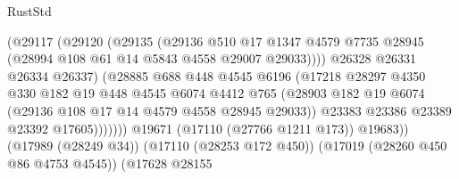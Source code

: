 \begin{lexlean}{RustStd}
\begin{coremodule}
                                          (@29117
                                            (@29120
                                              (@29135
                                                (@29136
                                                  @510
                                                  @17
                                                  @1347
                                                  @4579
                                                  @7735
                                                  @28945
                                                  (@28994 @108 @61 @14 @5843 @4558 @29007 @29033))))
                                            @26328
                                            @26331
                                            @26334
                                            @26337)
                                          (@28885
                                            @688
                                            @448
                                            @4545
                                            @6196
                                            (@17218
                                              @28297
                                              @4350
                                              @330
                                              @182
                                              @19
                                              @448
                                              @4545
                                              @6074
                                              @4412
                                              @765
                                              (@28903
                                                @182
                                                @19
                                                @6074
                                                (@29136 @108 @17 @14 @4579 @4558 @28945 @29033))
                                              @23383
                                              @23386
                                              @23389
                                              @23392
                                              @17605)))))))
                                @19671
                                (@17110 (@27766 @1211 @173))
                                @19683))
                            (@17989 (@28249 @34))
                            (@17110 (@28253 @172 @450))
                            (@17019 (@28260 @450 @86 @4753 @4545))
                            (@17628
                              @28155

\end{coremodule}
\end{lexlean}

